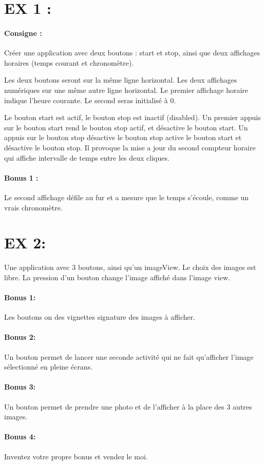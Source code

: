 \documentclass{article}
\begin{document}
\section{EX 1 :} 

\paragraph{Consigne : } Créer une application avec deux boutons : start et stop, ainsi que deux affichages horaires (temps courant et chronomètre).

Les deux boutons seront sur la même ligne horizontal. Les deux affichages numériques sur une même autre ligne horizontal.
Le premier affichage horaire indique l'heure courante. Le second seras initialisé à 0.

Le bouton start est actif, le bouton stop est inactif (disabled). Un premier appuis sur le bouton start rend le bouton stop actif, et désactive le bouton start. Un appuis sur le bouton stop désactive le bouton stop active le bouton start et désactive le bouton stop. Il provoque la mise a jour du second compteur horaire qui affiche intervalle de temps entre les deux cliques.

\paragraph{Bonus 1 :} Le second affichage défile au fur et a mesure que le temps s'écoule, comme un vrais chronomètre.

\section{EX 2:}
Une application avec 3 boutons, ainsi qu'un imageView. Le choix des images est libre. La pression d'un bouton change l'image affiché dans l'image view.


\paragraph{Bonus 1:} Les boutons on des vignettes signature des images à afficher.

\paragraph{Bonus 2:} Un bouton permet de lancer une seconde activité qui ne fait qu'afficher l'image sélectionné en pleine écrans.

\paragraph{Bonus 3:} Un bouton permet de prendre une photo et de l'afficher à la place des 3 autres images.

\paragraph{Bonus 4:} Inventez votre propre bonus et vendez le moi.
\end{document}
